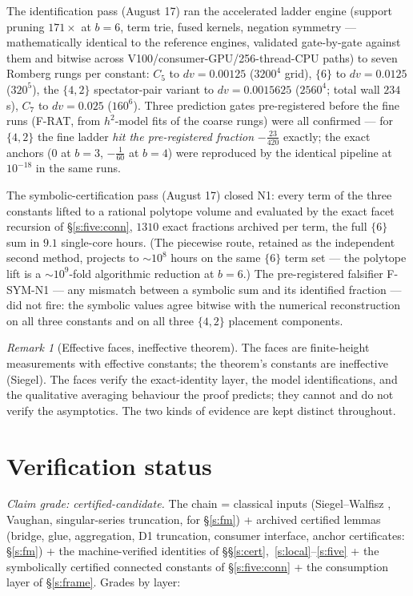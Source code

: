 \documentclass[11pt]{article}
\numberwithin{equation}{section}
\theoremstyle{definition}
\theoremstyle{remark}
\newtheorem{remark}[theorem]{Remark}
\begin{document}
The identification pass (August 17) ran the accelerated ladder
engine (support pruning $171\times$ at $b=6$, term trie, fused
kernels, negation symmetry --- mathematically identical to the
reference engines, validated gate-by-gate against them and
bitwise across V100/consumer-GPU/256-thread-CPU paths) to seven
Romberg rungs per constant: $C_5$ to $dv=0.00125$ ($3200^4$
grid), $\{6\}$ to $dv=0.0125$ ($320^5$), the $\{4,2\}$
spectator-pair variant to $dv=0.0015625$ ($2560^4$; total wall
$234$\,s), $C_7$ to $dv=0.025$ ($160^6$). Three prediction
gates pre-registered before the fine runs (F-RAT, from
$h^{2}$-model fits of the coarse rungs) were all confirmed ---
for $\{4,2\}$ the fine ladder \emph{hit the pre-registered
fraction} $-\tfrac{23}{420}$ exactly; the exact anchors ($0$
at $b=3$, $-\tfrac1{60}$ at $b=4$) were reproduced by the
identical pipeline at $10^{-18}$ in the same runs.

The symbolic-certification pass (August 17) closed N1: every term of
the three constants lifted to a rational polytope volume and
evaluated by the exact facet recursion of
\S\ref{s:five:conn}, $1310$ exact fractions archived per
term, the full $\{6\}$ sum in $9.1$ single-core hours. (The
piecewise route, retained as the independent second method,
projects to $\sim10^{8}$ hours on the same $\{6\}$ term set
--- the polytope lift is a $\sim10^{9}$-fold algorithmic
reduction at $b=6$.) The pre-registered falsifier F-SYM-N1
--- any mismatch between a symbolic sum and its identified
fraction --- did not fire: the symbolic values agree bitwise
with the numerical reconstruction on all three constants and
on all three $\{4,2\}$ placement components.

\begin{remark}[Effective faces, ineffective theorem]
The faces are finite-height measurements with effective
constants; the theorem's constants are ineffective (Siegel). The
faces verify the exact-identity layer, the model identifications,
and the qualitative averaging behaviour the proof predicts; they
cannot and do not verify the asymptotics. The two kinds of
evidence are kept distinct throughout.
\end{remark}

\section{Verification status}\label{s:verif}

\emph{Claim grade: certified-candidate.} The chain = classical
inputs (Siegel--Walfisz \cite{Dav,IK}, Vaughan, singular-series
truncation, \cite{MRT} for \S\ref{s:fm}) + archived certified
lemmas (bridge, glue, aggregation, D1 truncation, consumer
interface, anchor certificates: \S\ref{s:fm}) + the
machine-verified identities of
\S\S\ref{s:cert},~\ref{s:local}--\ref{s:five} + the
symbolically certified connected constants of
\S\ref{s:five:conn} + the
consumption layer of \S\ref{s:frame}. Grades by layer:
\end{document}
